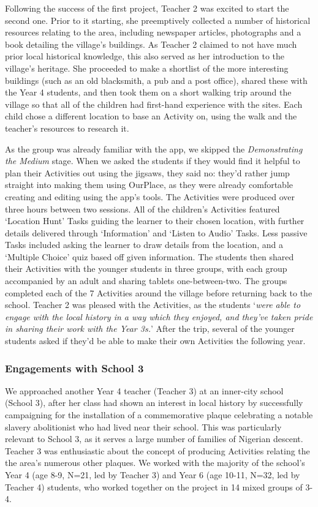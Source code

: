 \documentclass[,hyphens]{sigchi}
\begin{document}
Following the success of the first project, Teacher 2 was excited to start the second one. Prior to it starting, she preemptively collected a number of historical resources relating to the area, including newspaper articles, photographs and a book detailing the village's buildings. As Teacher 2 claimed to not have much prior local historical knowledge, this also served as her introduction to the village's heritage. She proceeded to make a shortlist of the more interesting buildings (such as an old blacksmith, a pub and a post office), shared these with the Year 4 students, and then took them on a short walking trip around the village so that all of the children had first-hand experience with the sites. Each child chose a different location to base an Activity on, using the walk and the teacher's resources to research it.

As the group was already familiar with the app, we skipped the \textit{Demonstrating the Medium} stage. When we asked the students if they would find it helpful to plan their Activities out using the jigsaws, they said no: they'd rather jump straight into making them using OurPlace, as they were already comfortable creating and editing using the app's tools. The Activities were produced over three hours between two sessions. All of the children's Activities featured `Location Hunt' Tasks guiding the learner to their chosen location, with further details delivered through `Information' and `Listen to Audio' Tasks. Less passive Tasks included asking the learner to draw details from the location, and a `Multiple Choice' quiz based off given information. The students then shared their Activities with the younger students in three groups, with each group accompanied by an adult and sharing tablets one-between-two. The groups completed each of the 7 Activities around the village before returning back to the school. Teacher 2 was pleased with the Activities, as the students `\textit{were able to engage with the local history in a way which they enjoyed, and they've taken pride in sharing their work with the Year 3s.}' After the trip, several of the younger students asked if they'd be able to make their own Activities the following year.

\subsubsection{Engagements with School 3}
We approached another Year 4 teacher (Teacher 3) at an inner-city school (School 3), after her class had shown an interest in local history by successfully campaigning for the installation of a commemorative plaque celebrating a notable slavery abolitionist who had lived near their school. This was particularly relevant to School 3, as it serves a large number of families of Nigerian descent. Teacher 3 was enthusiastic about the concept of producing Activities relating the the area's numerous other plaques. We worked with the majority of the school's Year 4 (age 8-9, N=21, led by Teacher 3) and Year 6 (age 10-11, N=32, led by Teacher 4) students, who worked together on the project in 14 mixed groups of 3-4.
\end{document}
